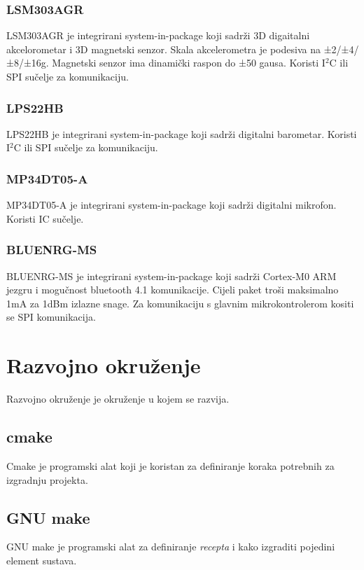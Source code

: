 \documentclass[times, utf8, diplomski]{fer}
\begin{document}
\subsubsection{LSM303AGR}
LSM303AGR je integrirani system-in-package koji sadr\v{z}i 3D digaitalni akcelorometar i 3D magnetski senzor. Skala akcelerometra je podesiva na
±2/±4/±8/±16g. Magnetski senzor ima dinami\v{c}ki raspon do ±50 gausa. Koristi I\(^2\)C ili SPI su\v{c}elje za komunikaciju.

\subsubsection{LPS22HB}
LPS22HB je integrirani system-in-package koji sadr\v{z}i digitalni barometar. Koristi I\(^2\)C ili SPI su\v{c}elje za komunikaciju.

\subsubsection{MP34DT05-A}
MP34DT05-A je integrirani system-in-package koji sadr\v{z}i digitalni mikrofon. Koristi IC su\v{c}elje.

\subsubsection{BLUENRG-MS}
BLUENRG-MS je integrirani system-in-package koji sadr\v{z}i Cortex-M0 ARM jezgru i mogu\v{c}nost bluetooth 4.1 komunikacije.
Cijeli paket tro\v{s}i maksimalno 1mA za 1dBm izlazne snage. Za komunikaciju s glavnim mikrokontrolerom kositi se SPI komunikacija.

\section{Razvojno okru\v{z}enje}
Razvojno okru\v{z}enje je okru\v{z}enje u kojem se razvija.

\subsection{cmake}
Cmake je programski alat koji je koristan za definiranje koraka potrebnih za izgradnju projekta.

\subsection{GNU make}
GNU make je programski alat za definiranje \textit{recepta} i kako izgraditi pojedini element sustava.
\end{document}
